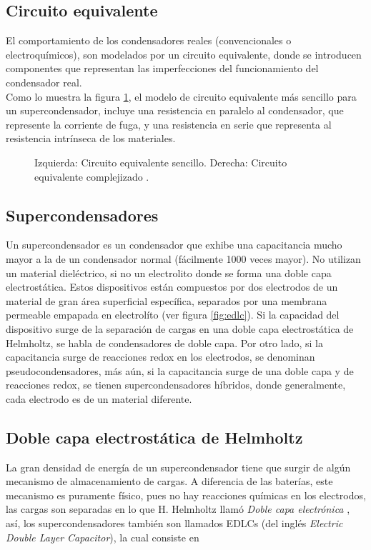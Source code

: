 \subsection{Circuito equivalente}
El comportamiento de los condensadores reales (convencionales o electroquímicos), son modelados por un circuito equivalente, donde se introducen componentes que representan las imperfecciones del funcionamiento del condensador real.\\
Como lo muestra la figura \ref{fig:equiv_both}, el modelo de circuito equivalente más sencillo para un supercondensador, incluye una resistencia en paralelo al condensador, que represente la corriente de fuga, y una resistencia en serie que representa al resistencia intrínseca de los materiales.

\begin{figure}
	\centering
	\caption[Circuito equivalente]{Izquierda: Circuito equivalente sencillo. Derecha: Circuito equivalente complejizado \citep{Fletcher2014}.}
	\label{fig:equiv_both}
\end{figure}

\subsection{Supercondensadores}
Un supercondensador es un condensador que exhibe una capacitancia mucho mayor a la de un condensador normal (fácilmente 1000 veces mayor). No utilizan un material dieléctrico, si no un electrolito donde se forma una doble capa electrostática. Estos dispositivos están compuestos por dos electrodos de un material de gran área superficial específica, separados por una membrana permeable empapada en electrolíto (ver figura \ref{fig:edlc}). Si la capacidad del dispositivo surge de la separación de cargas en una doble capa electrostática de Helmholtz, se habla de condensadores de doble capa. Por otro lado, si la capacitancia surge de reacciones redox en los electrodos, se denominan pseudocondensadores, más aún, si la capacitancia surge de una doble capa y de reacciones redox, se tienen supercondensadores híbridos, donde generalmente, cada electrodo es de un material diferente.

\subsection{Doble capa electrostática de Helmholtz}
La gran densidad de energía de un supercondensador tiene que surgir de algún mecanismo de almacenamiento de cargas. A diferencia de las baterías, este mecanismo es puramente físico, pues no hay reacciones químicas en los electrodos, las cargas son separadas en lo que H. Helmholtz llamó \emph{Doble capa electrónica} \citep{Frackowiak2001}, así, los supercondensadores también son llamados EDLCs (del inglés \emph{Electric Double Layer Capacitor}), la cual consiste en

